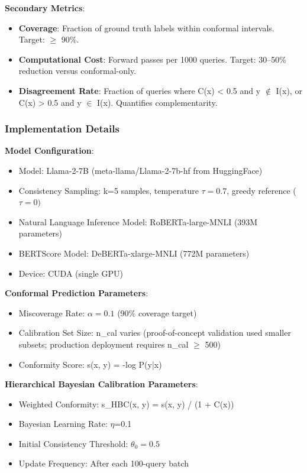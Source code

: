 \textbf{Secondary Metrics}:

\begin{itemize}
\item \textbf{Coverage}: Fraction of ground truth labels within conformal intervals. Target: $\geq$ 90\%.
\item \textbf{Computational Cost}: Forward passes per 1000 queries. Target: 30--50\% reduction versus conformal-only.
\item \textbf{Disagreement Rate}: Fraction of queries where C(x) < 0.5 and y $\notin$ I(x), or C(x) > 0.5 and y $\in$ I(x). Quantifies complementarity.
\end{itemize}

\subsubsection{Implementation Details}

\textbf{Model Configuration}:
\begin{itemize}
\item Model: Llama-2-7B (meta-llama/Llama-2-7b-hf from HuggingFace)
\item Consistency Sampling: k=5 samples, temperature $\tau =0.7$, greedy reference ($\tau =0)$
\item Natural Language Inference Model: RoBERTa-large-MNLI (393M parameters)
\item BERTScore Model: DeBERTa-xlarge-MNLI (772M parameters)
\item Device: CUDA (single GPU)
\end{itemize}

\textbf{Conformal Prediction Parameters}:
\begin{itemize}
\item Miscoverage Rate: $\alpha =0.1$ (90\% coverage target)
\item Calibration Set Size: n\_cal varies (proof-of-concept validation used smaller subsets; production deployment requires n\_cal $\geq$ 500)
\item Conformity Score: s(x, y) = -log P(y|x)
\end{itemize}

\textbf{Hierarchical Bayesian Calibration Parameters}:
\begin{itemize}
\item Weighted Conformity: s\_HBC(x, y) = s(x, y) / (1 + C(x))
\item Bayesian Learning Rate: $\eta$=0.1
\item Initial Consistency Threshold: $\theta _{0}=0.5$
\item Update Frequency: After each 100-query batch
\end{itemize}

